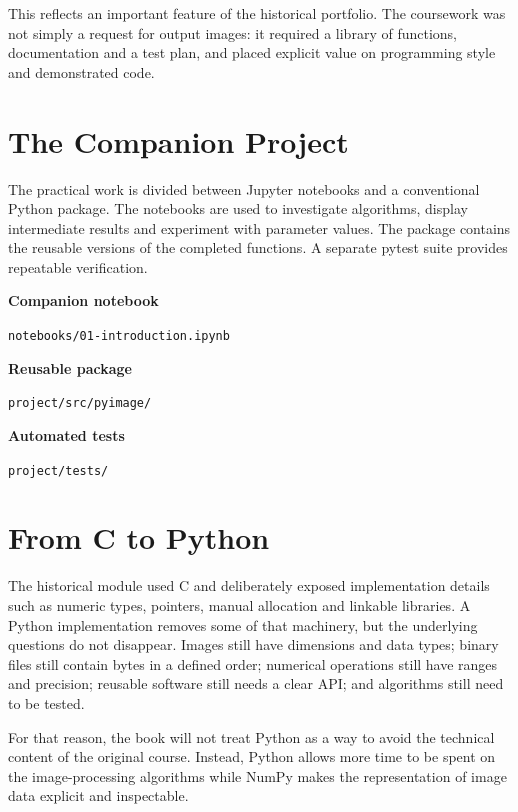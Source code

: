 This reflects an important feature of the historical portfolio. The coursework
was not simply a request for output images: it required a library of functions,
documentation and a test plan, and placed explicit value on programming style
and demonstrated code\cite{johnson_uqc146_assignment}.

\section{The Companion Project}

The practical work is divided between Jupyter notebooks and a conventional
Python package. The notebooks are used to investigate algorithms, display
intermediate results and experiment with parameter values. The package contains
the reusable versions of the completed functions. A separate pytest suite
provides repeatable verification.

\begin{projectfiles}
\textbf{Companion notebook}

\texttt{notebooks/01-introduction.ipynb}

\medskip

\textbf{Reusable package}

\texttt{project/src/pyimage/}

\medskip

\textbf{Automated tests}

\texttt{project/tests/}
\end{projectfiles}

\section{From C to Python}

The historical module used C and deliberately exposed implementation details
such as numeric types, pointers, manual allocation and linkable libraries. A
Python implementation removes some of that machinery, but the underlying
questions do not disappear. Images still have dimensions and data types; binary
files still contain bytes in a defined order; numerical operations still have
ranges and precision; reusable software still needs a clear API; and algorithms
still need to be tested.

For that reason, the book will not treat Python as a way to avoid the technical
content of the original course. Instead, Python allows more time to be spent on
the image-processing algorithms while NumPy makes the representation of image
data explicit and inspectable.

